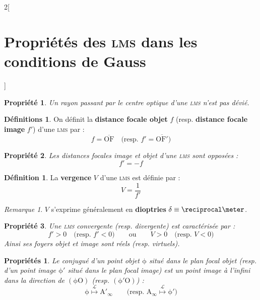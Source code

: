 \documentclass[french]{book}
\newtheorem*{propriete}{Propriété}
\newtheorem*{proprietes}{Propriétés}
\theoremstyle{definition}
\newtheorem*{definition}{Définition}
\newtheorem*{definitions}{Définitions}
\theoremstyle{remark}
\newtheorem*{remarque}{Remarque}
\newcommand*{\point}[1]{\mathrm{#1}}
\newcommand*{\droite}[1]{\mathrm{#1}}
\newcommand*{\algebrique}[1]{\overline{#1}}
\newcommand*{\tdef}[1]{\textbf{#1}}
\newcommand*{\imp}[1]{\emph{#1}}
\newcommand*{\abr}[1]{\textsc{#1}}
\begin{document}
\begin{landscape}
\begin{multicols*}{2}[\section{Propriétés des \abr{lms} dans les conditions de Gauss}]

\begin{propriete}
Un rayon passant par le \imp{centre optique} d'une \abr{lms} n'est pas dévié.
\end{propriete}

\begin{definitions}
On définit la \tdef{distance focale objet} $f$ (resp. \tdef{distance focale image} $f'$) d'une \abr{lms} par :
\[f = \algebrique{\point{O}\point{F}} \quad \text{(resp. } f' = \algebrique{\point{O}\point{F'}} \text{)}\]
\end{definitions}

\begin{propriete}
Les distances focales image et objet d'une \imp{\abr{lms}} sont opposées :
\[f' = -f\]
\end{propriete}

\begin{definition}
La \tdef{vergence} $V$ d'une \abr{lms} est définie par : 
\[V = \frac{1}{f'}\]
\end{definition}

\begin{remarque}
$V$ s'exprime généralement en \tdef{dioptries} $\delta \equiv \reciprocal\meter$.
\end{remarque}

\begin{propriete}
Une \imp{\abr{lms} convergente} (resp. \imp{divergente}) est caractérisée par :
\[f' > 0 \quad \text{(resp. } f' < 0 \text{)} \qquad \text{ou} \qquad V > 0 \quad \text{(resp. } V < 0 \text{)}\]
\noindent Ainsi ses foyers objet et image sont réels (resp. virtuels).
\end{propriete}

\begin{proprietes}
Le \imp{conjugué} d'un \imp{point objet} $\point{\phi}$ situé dans le \imp{plan focal objet} (resp. d'un \imp{point image} $\point{\phi'}$ situé dans le \imp{plan focal image}) est un \imp{point image à l'infini} dans la direction de $\droite{\left(\point{\phi}\point{O}\right)}$ (resp. $\droite{\left(\point{\phi'}\point{O}\right)}$) :
\[\point{\phi} \stackrel{\mathscr{L}}{\longmapsto} \point{A'}_{\infty}  \qquad \text{(resp. } \point{A}_{\infty} \stackrel{\mathscr{L}}{\longmapsto} \point{\phi'} \text{)}\]
\end{proprietes}


\end{multicols*}
\end{landscape}
\end{document}
